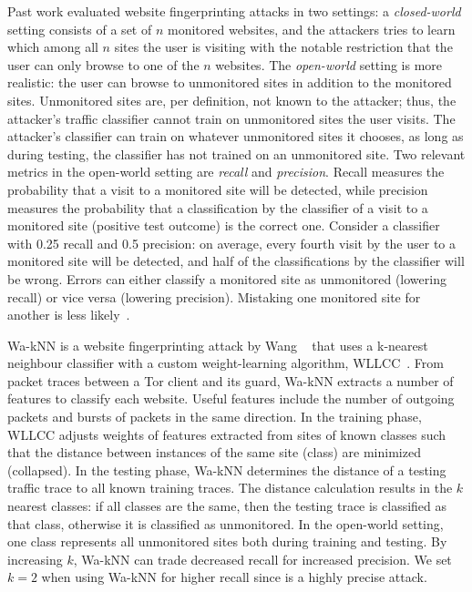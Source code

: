 Past work evaluated website fingerprinting attacks in two settings:
a {\em closed-world} setting consists of a set of $n$ {monitored}
websites, and the attackers tries to learn which among all $n$ sites the
user is visiting with the notable restriction that the user can only
browse to one of the $n$ websites.  The {\em open-world} setting is more
realistic: the user can browse to {unmonitored} sites in addition to the
monitored sites. Unmonitored sites are, per definition, not known to the
attacker; thus, the attacker's traffic classifier cannot train on unmonitored
sites the user visits. The attacker's classifier can train on
whatever unmonitored sites it chooses, as long as during testing, the
classifier has not trained on an unmonitored site. Two relevant metrics
in the open-world
setting are \emph{recall} and \emph{precision}.
Recall measures the probability that
a visit to a monitored site will be detected, while precision measures
the probability that a classification by the classifier of a visit to a
monitored site (positive test outcome) is the correct one. Consider a
classifier with 0.25 recall and 0.5 precision: on average, every fourth
visit by the user to a monitored site will be detected, and half of the
classifications by the classifier will be wrong. Errors can
either classify a monitored site as
unmonitored (lowering recall) or vice versa (lowering precision).
Mistaking one monitored site for another is less likely~\cite{WangThesis}.

Wa-kNN is a website fingerprinting attack by Wang \ea~\cite{Wang2014a}
that uses a k-nearest neighbour classifier with a custom weight-learning
algorithm, WLLCC~\cite{WangThesis}.  From {packet traces}
between a Tor client and its guard, Wa-kNN extracts a number of {features}
to classify each website.  Useful features include
the number of outgoing packets and bursts of packets in the same direction.
In the training phase, WLLCC adjusts {weights} of features extracted from
sites of known classes such that the {distance} between instances of the
same site (class) are minimized (collapsed).
In the testing phase, Wa-kNN determines the distance of a testing traffic trace
to all known training traces.  The distance calculation results in the $k$
nearest classes: if all classes are the same, then the testing trace is
classified as that class, otherwise it is classified as unmonitored.
In the open-world setting, one class represents all unmonitored sites both
during training and testing.  By increasing $k$, Wa-kNN can trade decreased
recall for increased precision.  We set $k=2$ when using Wa-kNN for higher
recall since \name is a highly precise attack.

